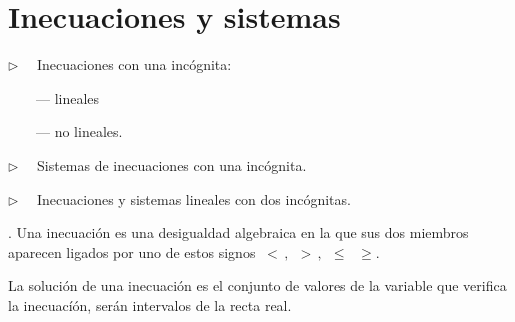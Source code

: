 \chapter{Inecuaciones y sistemas}


\vspace{5mm}
\begin{adjustwidth}{40pt}{40pt}
\begin{cuadro-gris}

	\begin{multicols}{2}
	
	$\triangleright \quad$  Inecuaciones con una incógnita: 
	
	$\qquad $--- lineales  
	
	$\qquad $--- no lineales.	
	
	$\triangleright \quad$  Sistemas de inecuaciones con una incógnita.
	
	$\triangleright \quad$ Inecuaciones y sistemas lineales con dos incógnitas.
	\end{multicols}
	
\end{cuadro-gris}
\end{adjustwidth}

\vspace{1cm}
\begin{definition}
.	Una inecuación es una desigualdad algebraica en la que sus dos miembros aparecen ligados por uno de estos signos $\ <\, , \ \ >\, , \ \ \leqslant \, \ \ \geqslant$. 

\vspace{2mm} La solución de una inecuación es el conjunto de valores de la variable que verifica la inecuacíón, serán intervalos de la recta real.
\end{definition}
\vspace{5mm}

